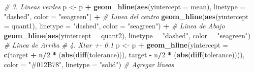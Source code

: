 \documentclass[
]{book}
\newenvironment{Shaded}{\begin{snugshade}}{\end{snugshade}}
\newcommand{\AttributeTok}[1]{\textcolor[rgb]{0.13,0.29,0.53}{#1}}
\newcommand{\CommentTok}[1]{\textcolor[rgb]{0.56,0.35,0.01}{\textit{#1}}}
\newcommand{\DecValTok}[1]{\textcolor[rgb]{0.00,0.00,0.81}{#1}}
\newcommand{\FunctionTok}[1]{\textcolor[rgb]{0.13,0.29,0.53}{\textbf{#1}}}
\newcommand{\NormalTok}[1]{#1}
\newcommand{\OtherTok}[1]{\textcolor[rgb]{0.56,0.35,0.01}{#1}}
\newcommand{\SpecialCharTok}[1]{\textcolor[rgb]{0.81,0.36,0.00}{\textbf{#1}}}
\newcommand{\StringTok}[1]{\textcolor[rgb]{0.31,0.60,0.02}{#1}}
\begin{document}
\begin{Shaded}
\begin{Highlighting}[]
  \CommentTok{\# 3. Lineas verdes}
\NormalTok{  p }\OtherTok{\textless{}{-}}\NormalTok{ p }\SpecialCharTok{+} \FunctionTok{geom\_hline}\NormalTok{(}\FunctionTok{aes}\NormalTok{(}\AttributeTok{yintercept =}\NormalTok{ mean), }\AttributeTok{linetype =} \StringTok{"dashed"}\NormalTok{, }\AttributeTok{color =} \StringTok{"seagreen"}\NormalTok{) }\SpecialCharTok{+} \CommentTok{\# Linea del centro}
    \FunctionTok{geom\_hline}\NormalTok{(}\FunctionTok{aes}\NormalTok{(}\AttributeTok{yintercept =}\NormalTok{ quant1), }\AttributeTok{linetype =} \StringTok{"dashed"}\NormalTok{, }\AttributeTok{color =} \StringTok{"seagreen"}\NormalTok{) }\SpecialCharTok{+} \CommentTok{\# Linea de Abajo}
    \FunctionTok{geom\_hline}\NormalTok{(}\FunctionTok{aes}\NormalTok{(}\AttributeTok{yintercept =}\NormalTok{ quant2), }\AttributeTok{linetype =} \StringTok{"dashed"}\NormalTok{, }\AttributeTok{color =} \StringTok{"seagreen"}\NormalTok{)   }\CommentTok{\# Linea de Arriba}
  \CommentTok{\# 4. Xtar +{-} 0.1}
\NormalTok{  p }\OtherTok{\textless{}{-}}\NormalTok{ p }\SpecialCharTok{+} \FunctionTok{geom\_hline}\NormalTok{(}\AttributeTok{yintercept =} \FunctionTok{c}\NormalTok{(target }\SpecialCharTok{+}\NormalTok{ n}\SpecialCharTok{/}\DecValTok{2} \SpecialCharTok{*}\NormalTok{ (}\FunctionTok{abs}\NormalTok{(}\FunctionTok{diff}\NormalTok{(tolerance))), target }\SpecialCharTok{{-}}\NormalTok{ n}\SpecialCharTok{/}\DecValTok{2} \SpecialCharTok{*}\NormalTok{ (}\FunctionTok{abs}\NormalTok{(}\FunctionTok{diff}\NormalTok{(tolerance)))), }\AttributeTok{color =} \StringTok{"\#012B78"}\NormalTok{, }\AttributeTok{linetype =} \StringTok{"solid"}\NormalTok{) }\CommentTok{\# Agregar líneas }
  

\end{Highlighting}
\end{Shaded}
\end{document}
